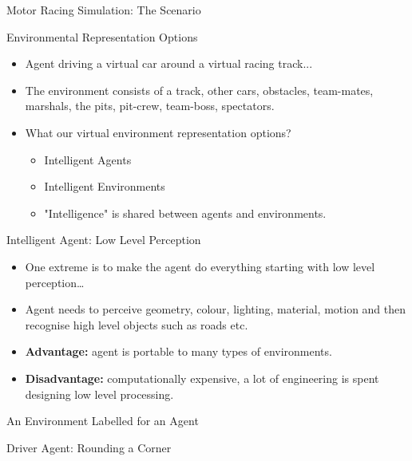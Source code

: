 \documentclass[aspectratio=1610,xcolor=dvipsnames,t]{beamer}
\begin{document}
\begin{frame}{Motor Racing Simulation: The Scenario}
\end{frame} 

\begin{frame}{Environmental Representation Options} 
    \begin{itemize}
        \item Agent driving a virtual car around a virtual racing track...
        \item The environment consists of a track, other cars,
              obstacles, team-mates, marshals, the pits, pit-crew,
              team-boss, spectators.
        \item What our virtual environment representation options?
            \begin{itemize}
                \item Intelligent Agents
                \item Intelligent Environments
                \item "Intelligence" is shared between agents and environments.
            \end{itemize}
    \end{itemize}
\end{frame} 

\begin{frame}{Intelligent Agent: Low Level Perception}
    \begin{itemize}
        \item One extreme is to make the agent do everything starting 
              with low level perception…
        \item Agent needs to perceive geometry, colour, lighting, material, 
              motion and then recognise high level objects such as roads etc.
        \item \textbf{Advantage:} agent is portable to many types of environments.
        \item \textbf{Disadvantage:} computationally expensive, a lot of 
               engineering is spent designing low level processing.
    \end{itemize}
\end{frame} 

\begin{frame}{An Environment Labelled for an Agent}
\end{frame} 

\begin{frame}{Driver Agent: Rounding a Corner}
\end{frame} 
\end{document}
